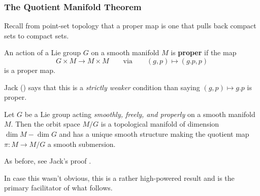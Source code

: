 \documentclass[12pt]{article}
\begin{document}
\subsubsection{The Quotient Manifold Theorem}
Recall from point-set topology that a proper map is one that pulls back compact sets to compact sets.
\begin{defn}
	An action of a Lie group $G$ on a smooth manifold $M$ is \textbf{proper} if the map 
	\[G\times M\to M\times M\qquad \text{via}\qquad (g,p)\mapsto(g.p,p)\]
	is a proper map.
\end{defn}
\begin{rmk}
	Jack (\cite[Ex. 21.3]{LeeISM}) says that this is a \textit{strictly weaker} condition than saying
	$(g,p)\mapsto g.p$ is proper.
\end{rmk}
\begin{thm}\label{thm-QMT}
	Let $G$ be a Lie group acting \textit{smoothly, freely, and properly} on a smooth manifold $M$. Then 
	the orbit space $M/G$ is a topological manifold of dimension $\dim M-\dim G$ and has a unique smooth structure 
	making the quotient map $\pi:M\to M/G$ a smooth submersion.
\end{thm}
\begin{prf}
	As before, see Jack's proof \cite[thm. 21.10]{LeeISM}.
\end{prf}
\begin{rmk}
	In case this wasn't obvious, this is a rather high-powered result and is the primary facilitator of what follows.
\end{rmk}
\end{document}

